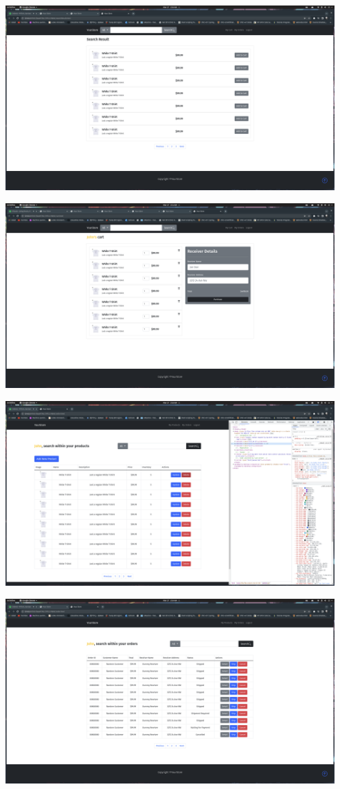 \documentclass[12pt]{article}
\begin{document}
\includegraphics[width=0.95\textwidth]{Screenshots/search_result.png}

\includegraphics[width=0.95\textwidth]{Screenshots/cart.png}

\includegraphics[width=0.95\textwidth]{Screenshots/seller_products.png}

\includegraphics[width=0.95\textwidth]{Screenshots/order.png}
\end{document}
